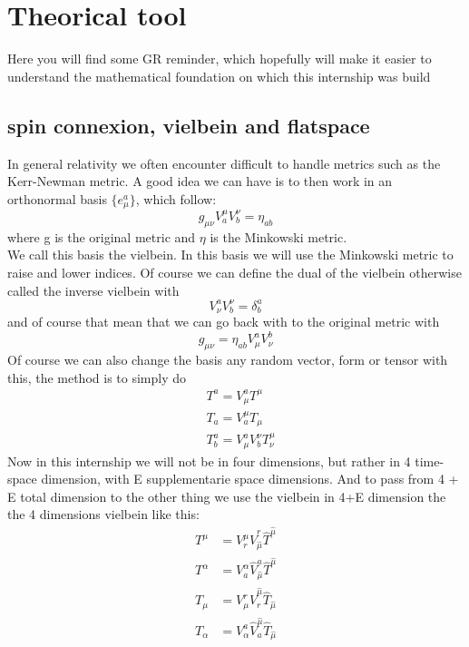 \documentclass{article}
\begin{document}
\section{Theorical tool} \label{tt}
Here you will find some GR reminder, which hopefully will make it easier to understand the mathematical foundation on which this internship was build
\subsection{spin connexion, vielbein and flatspace} \label{spinconnexionvielbeinandflatspace}
In general relativity we often encounter difficult to handle metrics such as the Kerr-Newman metric. A good idea we can have is to then work in an orthonormal basis $\{e^a_\mu \}$, which follow:
\begin{equation} \label{vieldef}
    g_{\mu \nu} V^{\mu}_{a}V^{\nu}_b = \eta_{ab}
\end{equation}
where g is the original metric and $\eta$ is the Minkowski metric.\\
We call this basis the vielbein. In this basis we will use the Minkowski metric to raise and lower indices.
Of course we can define the dual of the vielbein otherwise called the inverse vielbein with
\begin{equation} \label{inversviel}
    V^{a}_{\nu}V^{\nu}_b = \delta^a_b
\end{equation}
and of course that mean that we can go back with to the original metric with
\begin{equation} \label{toflatmet}
    g_{\mu \nu}  = \eta_{ab}V^{a}_{\mu}V^{b}_\nu
\end{equation}
Of course we can also change the basis any random vector, form or tensor with this, the method is to simply do
\begin{align} \label{changeofbasis}
    &T^a  =  V^a_\mu T^\mu \\
    &T_a =   V^\mu_a T_\mu  \\
    &T^a_b = V^a_\mu V^\nu_b T^\mu_\nu
\end{align}
Now in this internship we will not be in four dimensions, but rather in 4 time-space dimension, with E supplementarie space dimensions. And to pass from 4 + E total dimension to the other thing we use the vielbein in 4+E dimension the the 4 dimensions vielbein like this:
\begin{subequations} \label{lowdimv}
    \begin{align}
        T^{\mu} &= V_r^\mu \hat V^r_{\hat \mu}\hat T^{\hat \mu} \\ \label{scalartrans}
        T^{\alpha} &= V_a^\alpha \hat V^a_{\hat \mu}\hat T^{\hat \mu}\\ \label{vectortrans}
        T_{\mu} &= V_\mu^r \hat V_r^{\hat \mu}\hat T_{\hat \mu}\\  \label{formtrans}
        T_{\alpha} &= V_\alpha^a \hat V_a^{\hat \mu}\hat T_{\hat \mu} \\  \label{tenstrans}
    \end{align}
\end{subequations}
\end{document}

